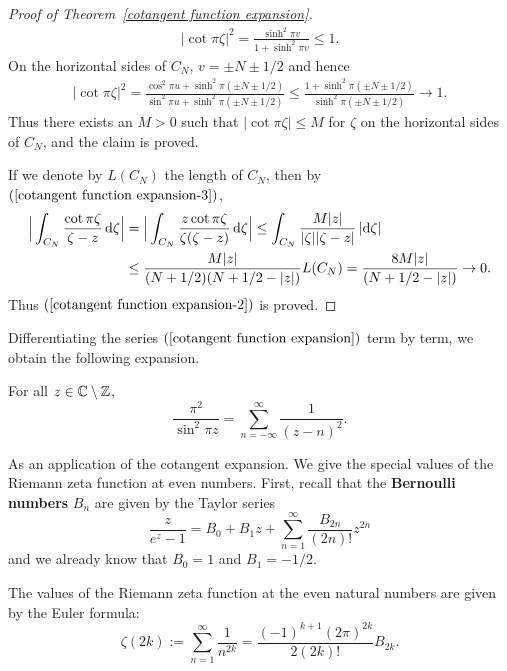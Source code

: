 \begin{proof}[Proof of Theorem~\ref{cotangent function expansion}]
\begin{align}\label{cot function bounded on vertical}
|\cot\pi\zeta|^2=\frac{\sinh^2\pi v}{1+\sinh^2\pi v}\leq 1.
\end{align}
On the horizontal sides of $C_N$, $v=\pm N\pm 1/2$ and hence
\begin{align}\label{cot function bounded on horizontal}
|\cot\pi\zeta|^2=\frac{\cos^2\pi u+\sinh^2\pi(\pm N\pm 1/2)}{\sin^2\pi u+\sinh^2\pi(\pm N\pm 1/2)}\leq\frac{1+\sinh^2\pi(\pm N\pm 1/2)}{\sinh^2\pi(\pm N\pm 1/2)}\to 1.
\end{align}
Thus there exists an $M>0$ such that $|\cot\pi\zeta|\leq M$ for $\zeta$ on the horizontal sides of $C_N$, and the claim is proved.\par
If we denote by $L(C_N)$ the length of $C_N$, then by $(\ref{cotangent function expansion-3})$,
\begin{align*}
\Big|\int_{C_N}\frac{\cot\pi\zeta}{\zeta-z}\mathop{}\!\mathrm{d}\zeta\Big|&=\Big|\int_{C_N}\frac{z\cot\pi\zeta}{\zeta(\zeta-z)}\mathop{}\!\mathrm{d}\zeta\Big|\leq\int_{C_N}\frac{M|z|}{|\zeta||\zeta-z|}\,|\mathrm{d}\zeta|\\
&\leq\frac{M|z|}{(N+1/2)(N+1/2-|z|)}L(C_N)=\frac{8M|z|}{(N+1/2-|z|)}\to 0.
\end{align*}
Thus $(\ref{cotangent function expansion-2})$ is proved.
\end{proof}
Differentiating the series $(\ref{cotangent function expansion})$ term by term, we obtain the following expansion.
\begin{corollary}
For all $z\in\mathbb{C}\setminus\mathbb{Z}$,
\[\frac{\pi^2}{\sin^2\pi z}=\sum_{n=-\infty}^{\infty}\frac{1}{(z-n)^2}.\]
\end{corollary}
As an application of the cotangent expansion. We give the special values of the Riemann zeta function at even numbers. First, recall that the \textbf{Bernoulli numbers} $B_n$ are given by the Taylor series
\[\frac{z}{e^z-1}=B_0+B_1z+\sum_{n=1}^{\infty}\frac{B_{2n}}{(2n)!}z^{2n}\]
and we already know that $B_0=1$ and $B_1=-1/2$.
\begin{theorem}
The values of the Riemann zeta function at the even natural numbers are given by the Euler formula:
\[\zeta(2k):=\sum_{n=1}^{\infty}\frac{1}{n^{2k}}=\frac{(-1)^{k+1}(2\pi)^{2k}}{2(2k)!}B_{2k}.\]
\end{theorem}
